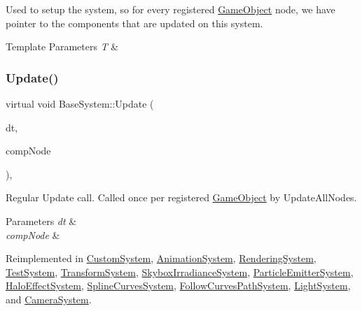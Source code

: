 Used to setup the system, so for every registered \hyperlink{classGameObject}{Game\+Object} node, we have pointer to the components that are updated on this system. 


\begin{DoxyTemplParams}{Template Parameters}
{\em T} & \\
\hline
\end{DoxyTemplParams}
\mbox{\label{classBaseSystem_a465191589a1ef8b8f3a8e20fa4656d47}} 
\subsubsection{\texorpdfstring{Update()}{Update()}}
{\footnotesize\ttfamily virtual void Base\+System\+::\+Update (\begin{DoxyParamCaption}\item[{float}]{dt,  }\item[{\hyperlink{structBaseSystemCompNode}{Base\+System\+Comp\+Node} $\ast$}]{comp\+Node }\end{DoxyParamCaption})\hspace{0.3cm}{\ttfamily [inline]}, {\ttfamily [virtual]}}



Regular Update call. Called once per registered \hyperlink{classGameObject}{Game\+Object} by Update\+All\+Nodes. 


\begin{DoxyParams}{Parameters}
{\em dt} & \\
\hline
{\em comp\+Node} & \\
\hline
\end{DoxyParams}


Reimplemented in \hyperlink{classCustomSystem_ab8b072ffd6b4de7404b385068d735c61}{Custom\+System}, \hyperlink{classAnimationSystem_aa74600f86761b9bb47a0689665901a49}{Animation\+System}, \hyperlink{classRenderingSystem_a658cdef75c3fc6d555347fb787eec460}{Rendering\+System}, \hyperlink{classTestSystem_a3742fdf321596824bc2aac8a91a3ddb0}{Test\+System}, \hyperlink{classTransformSystem_a75de8bdeda1137447d575b30d16afb3b}{Transform\+System}, \hyperlink{classSkyboxIrradianceSystem_ad1acf756b9540bb2864e5bf9631f9539}{Skybox\+Irradiance\+System}, \hyperlink{classParticleEmitterSystem_a58c14c4c3318b2fe31e35c93789da998}{Particle\+Emitter\+System}, \hyperlink{classHaloEffectSystem_ad98bff0ea12ef7d8abb1c917318e6028}{Halo\+Effect\+System}, \hyperlink{classSplineCurvesSystem_acc8b36c8c85662437bc2020f29e4d4b6}{Spline\+Curves\+System}, \hyperlink{classFollowCurvesPathSystem_a23f3ab7e281025eb8e40ef150a05a3b4}{Follow\+Curves\+Path\+System}, \hyperlink{classLightSystem_a492572de092cdbaf76c3ca4d9806df94}{Light\+System}, and \hyperlink{classCameraSystem_ab0ea25c2a8f704f0a0674a3bc61ddd68}{Camera\+System}.

